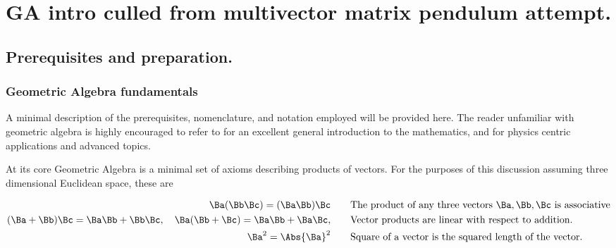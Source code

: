 

\chapter{GA intro culled from multivector matrix pendulum attempt.}
\label{chap:gaMintro}
{}
\date{Nov 26, 2009}

\beginArtWithToc

\section{Prerequisites and preparation.}

\subsection{Geometric Algebra fundamentals}

A minimal description of the prerequisites, nomenclature, and notation employed will be provided here.  The reader unfamiliar with geometric algebra is highly encouraged to refer to \cite{dorst2007gac} for an excellent general introduction to the mathematics, and \cite{doran2003gap} for physics centric applications and advanced topics.

At its core Geometric Algebra is a minimal set of axioms describing products of vectors.  For the purposes of this discussion assuming three dimensional Euclidean space, these are

\begin{axiom}
\begin{subequations}\label{axiom:gaMintro:all}
\begin{align}
\Ba (\Bb \Bc) = (\Ba \Bb) \Bc & \qquad \mbox{The product of any three vectors $\Ba,\Bb,\Bc$ is associative} \\
(\Ba + \Bb) \Bc = \Ba \Bb + \Bb \Bc, \quad
\Ba (\Bb + \Bc) = \Ba \Bb + \Ba \Bc,
 & \qquad \mbox{Vector products are linear with respect to addition.} \\
\Ba^2 = \Abs{\Ba}^2 & \qquad \mbox{Square of a vector is the squared length of the vector.} \label{axiom:gaMintro:contraction}
\end{align}
\end{subequations}
\end{axiom}

